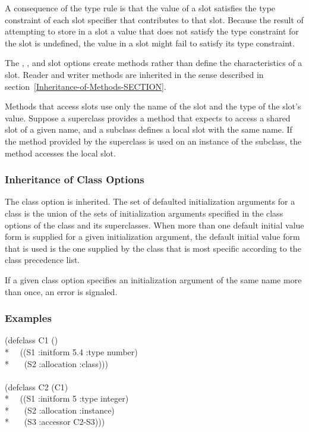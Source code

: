 A consequence of the type rule is that the value of a slot satisfies
the type constraint of each slot specifier that contributes to that
slot.  Because the result of attempting to store in a slot a value
that does not satisfy the type constraint for the slot is undefined,
the value in a slot might fail to satisfy its type constraint.

The , , and  slot options
create methods rather than define the characteristics of a slot.
Reader and writer  methods are inherited in the sense described in
section~\ref{Inheritance-of-Methods-SECTION}. 

Methods that access slots use only the name of the slot and the type
of the slot's value.  Suppose a superclass provides a method that
expects to access a shared slot of a given name, and a subclass defines
a local slot with the same name.  If the method provided by the
superclass is used on an instance of the subclass, the method accesses
the local slot.

\subsubsection{Inheritance of Class Options}

The  class option is inherited.  The set of
defaulted initialization arguments for a class is the union of the
sets of initialization arguments specified in the 
 class options of the class and its superclasses.
When more than one default initial value form is supplied for a given
initialization argument, the default initial value form that is used
is the one supplied by the class that is most specific according to
the class precedence list.


If a given  class option specifies an
initialization argument of the same name more than once, an
error is signaled.

\subsubsection{Examples}

\begin{lisp}
(defclass C1 () \\*
~~((S1 :initform 5.4 :type number) \\*
~~~(S2 :allocation :class))) \\
\\
(defclass C2 (C1) \\*
~~((S1 :initform 5 :type integer)\\*
~~~(S2 :allocation :instance)\\*
~~~(S3 :accessor C2-S3)))
\end{lisp}


